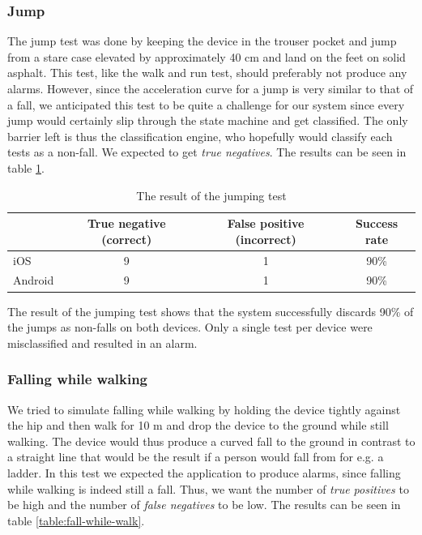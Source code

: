 \documentclass[12pt, a4paper, onecolumn]{article}
\begin{document}
	\subsubsection{Jump}
	The jump test was done by keeping the device in the trouser pocket and jump from a stare case elevated by approximately 40 cm and land on the feet on solid asphalt. This test, like the walk and run test, should preferably not produce any alarms. However, since the acceleration curve for a jump is very similar to that of a fall, we anticipated this test to be quite a challenge for our system since every jump would certainly slip through the state machine and get classified. The only barrier left is thus the classification engine, who hopefully would classify each tests as a non-fall. We expected to get \textit{true negatives}. The results can be seen in table \ref{table:jump-test}.
	
	\begin{table}[H]
		\centering
		\begin{tabular}{|l|c|c|c|}
			\hline
			& True negative (correct) & False positive (incorrect) & Success rate \\ \hline
			iOS     & 9            & 1             & 90\%        \\ \hline
			Android & 9            & 1              & 90\%        \\ \hline
		\end{tabular}
		\caption{The result of the jumping test}
		\label{table:jump-test}
	\end{table}
	
	The result of the jumping test shows that the system successfully discards 90\% of the jumps as non-falls on both devices. Only a single test per device were misclassified and resulted in an alarm.
	
	\subsubsection{Falling while walking}
	\label{section:falling-while-walking}
	We tried to simulate falling while walking by holding the device tightly against the hip and then walk for 10 m and drop the device to the ground while still walking. The device would thus produce a curved fall to the ground in contrast to a straight line that would be the result if a person would fall from for e.g. a ladder. In this test we expected the application to produce alarms, since falling while walking is indeed still a fall. Thus, we want the number of \textit{true positives} to be high and the number of \textit{false negatives} to be low. The results can be seen in table \ref{table:fall-while-walk}.
	
\end{document}

